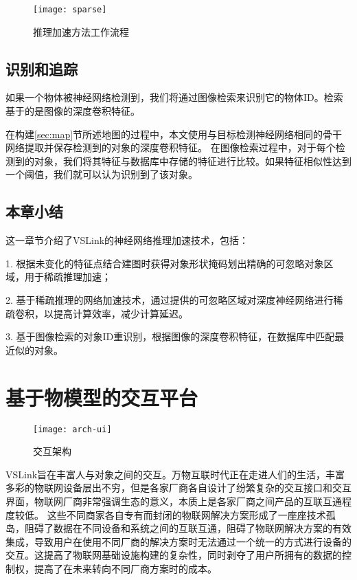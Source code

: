 \begin{figure}[htbp]
	\centering
	\texttt{[image: sparse]}
	\caption{推理加速方法工作流程}
	\label{fig:sparse-conv}
\end{figure}

\section{识别和追踪}
如果一个物体被神经网络检测到，我们将通过图像检索来识别它的物体ID。检索基于的是图像的深度卷积特征。

在构建\ref{sec:map}节所述地图的过程中，本文使用与目标检测神经网络相同的骨干网络提取并保存检测到的对象的深度卷积特征。
在图像检索过程中，对于每个检测到的对象，我们将其特征与数据库中存储的特征进行比较。如果特征相似性达到一个阈值，我们就可以认为识别到了该对象。


\section{本章小结}
这一章节介绍了VSLink的神经网络推理加速技术，包括：

1. 根据未变化的特征点结合建图时获得对象形状掩码划出精确的可忽略对象区域，用于稀疏推理加速；

2. 基于稀疏推理的网络加速技术，通过提供的可忽略区域对深度神经网络进行稀疏卷积，以提高计算效率，减少计算延迟。

3. 基于图像检索的对象ID重识别，根据图像的深度卷积特征，在数据库中匹配最近似的对象。


\chapter{基于物模型的交互平台}
\label{chap:flexible}

\begin{figure}[htbp]
	\centering
	\texttt{[image: arch-ui]}
	\caption{交互架构}
	\label{fig:arch-ui}
\end{figure}

VSLink旨在丰富人与对象之间的交互。万物互联时代正在走进人们的生活，丰富多彩的物联网设备层出不穷，但是各家厂商各自设计了纷繁复杂的交互接口和交互界面，物联网厂商非常强调生态的意义，本质上是各家厂商之间产品的互联互通程度较低。
这些不同商家各自专有而封闭的物联网解决方案形成了一座座技术孤岛，阻碍了数据在不同设备和系统之间的互联互通，阻碍了物联网解决方案的有效集成，导致用户在使用不同厂商的解决方案时无法通过一个统一的方式进行设备的交互。这提高了物联网基础设施构建的复杂性，同时剥夺了用户所拥有的数据的控制权，提高了在未来转向不同厂商方案时的成本。

